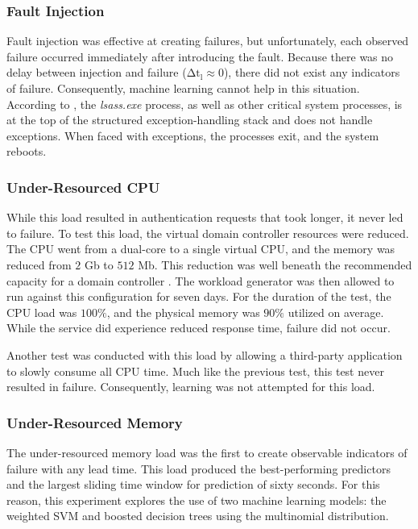 \subsubsection{Fault Injection}
Fault injection was effective at creating failures, but unfortunately, each
observed failure occurred immediately after introducing the fault.  Because
there was no delay between injection and failure ($\mathrm{\Delta t_l \approx
0}$), there did not exist any indicators of failure.  Consequently, machine
learning cannot help in this situation.  According to \citet{russinovich2009},
the \emph{lsass.exe} process, as well as other critical system processes, is at
the top of the structured exception-handling stack and does not handle
exceptions.  When faced with exceptions, the processes exit, and the system
reboots.

\subsubsection{Under-Resourced \ac{CPU}}
While this load resulted in authentication requests that took longer, it never
led to failure.  To test this load, the virtual domain controller resources
were reduced.  The \ac{CPU} went from a dual-core to a single virtual CPU, and
the memory was reduced from $2$ Gb to $512$ Mb.  This reduction was well
beneath the recommended capacity for a domain controller \citep{mak12}.  The
workload generator was then allowed to run against this configuration for seven
days.  For the duration of the test, the \ac{CPU} load was $100\%$, and the
physical memory was $90\%$ utilized on average.  While the service did
experience reduced response time, failure did not occur.

Another test was conducted with this load by allowing a third-party application
to slowly consume all \ac{CPU} time.  Much like the previous test, this test
never resulted in failure.  Consequently, learning was not attempted for this
load.

\subsubsection{Under-Resourced Memory}
The under-resourced memory load was the first to create observable indicators
of failure with any lead time.  This load produced the best-performing
predictors and the largest sliding time window for prediction of sixty seconds.
For this reason, this experiment explores the use of two machine learning
models: the weighted \ac{SVM} and boosted decision trees using the multinomial
distribution.  

